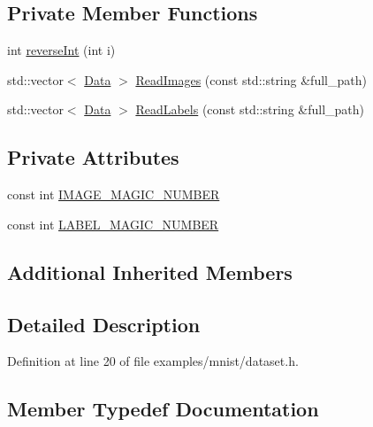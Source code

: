 \subsection*{Private Member Functions}
\begin{DoxyCompactItemize}
\item 
int \hyperlink{classmarian_1_1data_1_1MNIST_a631d1fd994e50776b4daf8c9853c0f88}{reverse\+Int} (int i)
\item 
std\+::vector$<$ \hyperlink{namespacemarian_1_1data_a5801e80ecb76ee38a5ac080f08d9646c}{Data} $>$ \hyperlink{classmarian_1_1data_1_1MNIST_a632c9c300ce5389d27ce97e326571137}{Read\+Images} (const std\+::string \&full\+\_\+path)
\item 
std\+::vector$<$ \hyperlink{namespacemarian_1_1data_a5801e80ecb76ee38a5ac080f08d9646c}{Data} $>$ \hyperlink{classmarian_1_1data_1_1MNIST_a81c2e2ce98c2b3cfbe3f772900a74c62}{Read\+Labels} (const std\+::string \&full\+\_\+path)
\end{DoxyCompactItemize}
\subsection*{Private Attributes}
\begin{DoxyCompactItemize}
\item 
const int \hyperlink{classmarian_1_1data_1_1MNIST_ad57aae96aaef230ede91eadb4d2cbbb7}{I\+M\+A\+G\+E\+\_\+\+M\+A\+G\+I\+C\+\_\+\+N\+U\+M\+B\+ER}
\item 
const int \hyperlink{classmarian_1_1data_1_1MNIST_a6c03087f0ab278cfdf5168985497135d}{L\+A\+B\+E\+L\+\_\+\+M\+A\+G\+I\+C\+\_\+\+N\+U\+M\+B\+ER}
\end{DoxyCompactItemize}
\subsection*{Additional Inherited Members}


\subsection{Detailed Description}


Definition at line 20 of file examples/mnist/dataset.\+h.



\subsection{Member Typedef Documentation}
